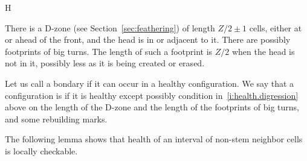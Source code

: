 \documentclass[11pt]{memoir}
\theoremstyle{definition} %
\newcommand{\Z}{Z} %
\begin{document}
\begin{varenum}{H}
\item\label{i:health.digression} There is a D-zone (see Section~\ref{sec:feathering})
  of length \( \Z/2\pm 1 \)
  cells, either at or ahead of the front, and the head is in or adjacent to it.
  There are possibly footprints of big turns.
  The length of such a footprint is \( \Z/2 \) when the head is not
  in it, possibly less as it is being created or erased.
\end{varenum}

\begin{definition}\label{def:legal-boundary}
  Let us call a bondary  if it can occur in a healthy configuration.
  We say that a configuration is  if it is healthy 
  except possibly condition in~\eqref{i:health.digression} above
  on the length of the D-zone and the length of the footprints of big turns,
  and some rebuilding marks.
\end{definition}

The following lemma shows that health of an interval of non-stem neighbor cells
is locally checkable.
 
\end{document}
